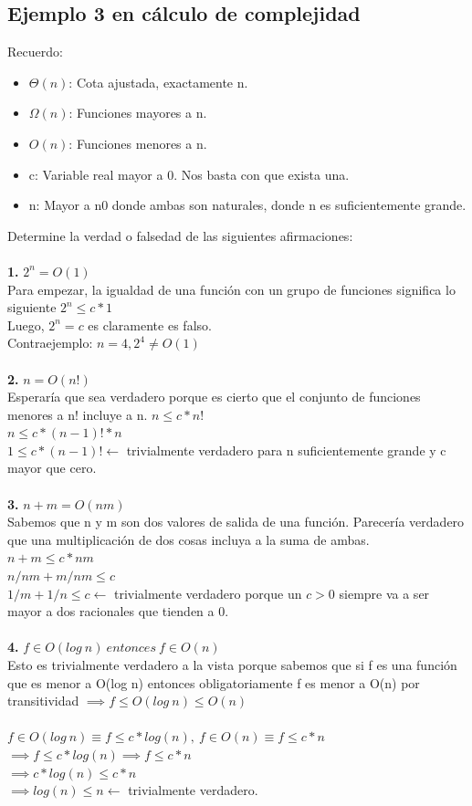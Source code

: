 \documentclass[10pt,a4paper]{article}
\begin{document}
\subsection*{Ejemplo 3 en cálculo de complejidad}
Recuerdo:
\begin{itemize}
    \item $\Theta(n)$: Cota ajustada, exactamente n. 
    \item $\Omega(n)$: Funciones mayores a n.
    \item $O(n)$: Funciones menores a n.
    \item c: Variable real mayor a 0. Nos basta con que exista una. 
    \item n: Mayor a n0 donde ambas son naturales, donde n es suficientemente grande.
\end{itemize}
Determine la verdad o falsedad de las siguientes afirmaciones: \\ \\ 
\textbf{1.} $ 2^{n} = O(1) $ \\
Para empezar, la igualdad de una función con un grupo de funciones significa lo siguiente $ 2^{n} \le c \ast 1 $ \\ 
Luego, $ 2^{n} = c $ es claramente es falso. \\ 
Contraejemplo: $ n = 4, 2^4 \neq O(1)$ \\ \\
\textbf{2.} $ n = O(n!) $ \\
Esperaría que sea verdadero porque es cierto que el conjunto de funciones menores a n! incluye a n.
$ n \le c * n!$ \\
$ n \le c * (n-1)! * n$ \\
$ 1 \le c * (n-1)! \leftarrow $ trivialmente verdadero para n suficientemente grande y c mayor que cero.\\ \\
\textbf{3.} $ n+m = O(nm) $ \\
Sabemos que n y m son dos valores de salida de una función. Parecería verdadero que una multiplicación de dos cosas incluya a la suma de ambas. \\
$ n+m \le c * nm $ \\
$ n/nm + m/nm \le c $ \\
$ 1/m + 1/n \le c \leftarrow $ trivialmente verdadero porque un $c>0$ siempre va a ser mayor a dos racionales que tienden a 0. \\ \\ 
\textbf{4.} $ f \in O(log \ n) \ entonces \ f \in O(n) $ \\
Esto es trivialmente verdadero a la vista porque sabemos que si f es una función que es menor a O(log n) entonces obligatoriamente f es menor a O(n) por transitividad $ \implies f \le O(log \ n) \le O(n) $ \\ \\  
$ f \in O(log \ n) \equiv f \le c * log(n), \ f \in O(n) \equiv f \le c * n $ \\
$ \implies f \le c * log(n) \implies f \le c * n $ \\
$ \implies c * log(n) \le c * n $ \\
$ \implies log(n) \le n \leftarrow $ trivialmente verdadero.
\newpage
\end{document}
